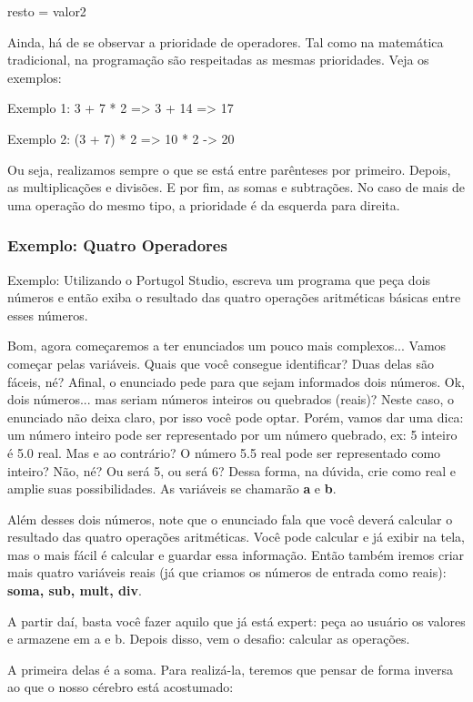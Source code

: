 \documentclass{article}
\begin{document}
resto = valor2 %

Ainda, há de se observar a prioridade de operadores. Tal como na matemática tradicional, na programação são respeitadas as mesmas prioridades. Veja os exemplos:

Exemplo 1: 3 + 7 * 2 => 3  + 14 => 17

Exemplo 2: (3 + 7) * 2 => 10 * 2 -> 20

Ou seja, realizamos sempre o que se está entre parênteses por primeiro. Depois, as multiplicações e divisões. E por fim, as somas e subtrações. No caso de mais de uma operação do mesmo tipo, a prioridade é da esquerda para direita.

\subsubsection{Exemplo: Quatro Operadores}
Exemplo: Utilizando o Portugol Studio, escreva um programa que peça dois números e então exiba o resultado das quatro operações aritméticas básicas entre esses números.

Bom, agora começaremos a ter enunciados um pouco mais complexos... Vamos começar pelas variáveis. Quais que você consegue identificar? Duas delas são fáceis, né? Afinal, o enunciado pede para que sejam informados dois números. Ok, dois números... mas seriam números inteiros ou quebrados (reais)? Neste caso, o enunciado não deixa claro, por isso você pode optar. Porém, vamos dar uma dica: um número inteiro pode ser representado por um número quebrado, ex: 5 inteiro é 5.0 real. Mas e ao contrário? O número 5.5 real pode ser representado como inteiro? Não, né? Ou será 5, ou será 6? Dessa forma, na dúvida, crie como real e amplie suas possibilidades. As variáveis se chamarão \textbf{a} e \textbf{b}.

Além desses dois números, note que o enunciado fala que você deverá calcular o resultado das quatro operações aritméticas. Você pode calcular e já exibir na tela, mas o mais fácil é calcular e guardar essa informação. Então também iremos criar mais quatro variáveis reais (já que criamos os números de entrada como reais): \textbf{soma, sub, mult, div}.

A partir daí, basta você fazer aquilo que já está expert: peça ao usuário os valores e armazene em a e b. Depois disso, vem o desafio: calcular as operações.

A primeira delas é a soma. Para realizá-la, teremos que pensar de forma inversa ao que o nosso cérebro está acostumado:
\end{document}
